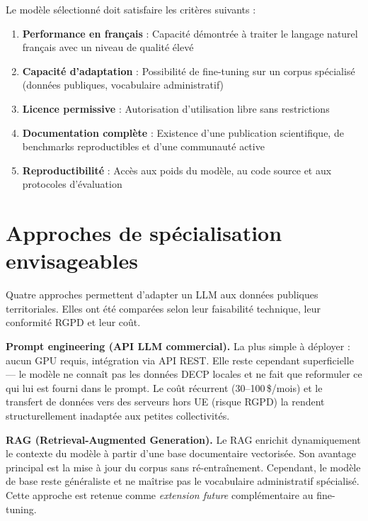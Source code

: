 Le modèle sélectionné doit satisfaire les critères suivants :

\begin{enumerate}
    \item \textbf{Performance en français} : Capacité démontrée à traiter le langage naturel français avec un niveau de qualité élevé
    
    \item \textbf{Capacité d'adaptation} : Possibilité de fine-tuning sur un corpus spécialisé (données publiques, vocabulaire administratif)
    
    \item \textbf{Licence permissive} : Autorisation d'utilisation libre sans restrictions
    
    \item \textbf{Documentation complète} : Existence d'une publication scientifique, de benchmarks reproductibles et d'une communauté active
    
    \item \textbf{Reproductibilité} : Accès aux poids du modèle, au code source et aux protocoles d'évaluation
\end{enumerate}

\section{Approches de spécialisation envisageables}

Quatre approches permettent d'adapter un LLM aux données publiques territoriales. Elles ont été comparées selon leur faisabilité technique, leur conformité RGPD et leur coût.

\textbf{Prompt engineering (API LLM commercial).} La plus simple à déployer : aucun GPU requis, intégration via API REST. Elle reste cependant superficielle — le modèle ne connaît pas les données DECP locales et ne fait que reformuler ce qui lui est fourni dans le prompt. Le coût récurrent (30--100\,\$/mois) et le transfert de données vers des serveurs hors UE (risque RGPD) la rendent structurellement inadaptée aux petites collectivités.

\textbf{RAG (Retrieval-Augmented Generation).} Le RAG \citep{lewis2020rag} enrichit dynamiquement le contexte du modèle à partir d'une base documentaire vectorisée. Son avantage principal est la mise à jour du corpus sans ré-entraînement. Cependant, le modèle de base reste généraliste et ne maîtrise pas le vocabulaire administratif spécialisé. Cette approche est retenue comme \textit{extension future} complémentaire au fine-tuning.

